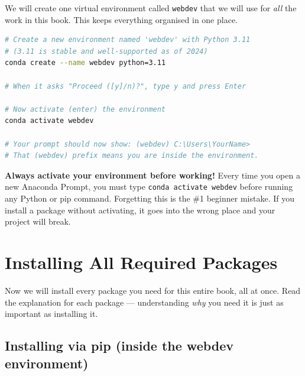 \documentclass[12pt, a4paper]{book}
\begin{document}
We will create one virtual environment called \texttt{webdev} that we will use
for \emph{all} the work in this book. This keeps everything organised in one place.

\begin{lstlisting}[language=bash, style=bashstyle, caption={Create the webdev Environment}]
# Create a new environment named 'webdev' with Python 3.11
# (3.11 is stable and well-supported as of 2024)
conda create --name webdev python=3.11

# When it asks "Proceed ([y]/n)?", type y and press Enter

# Now activate (enter) the environment
conda activate webdev

# Your prompt should now show: (webdev) C:\Users\YourName>
# That (webdev) prefix means you are inside the environment.
\end{lstlisting}

\begin{tcolorbox}[warnbox]
\textbf{Always activate your environment before working!}
Every time you open a new Anaconda Prompt, you must type
\texttt{conda activate webdev} before running any Python or pip command.
Forgetting this is the \#1 beginner mistake. If you install a package
without activating, it goes into the wrong place and your project will break.
\end{tcolorbox}

\section{Installing All Required Packages}

Now we will install every package you need for this entire book, all at once.
Read the explanation for each package --- understanding \emph{why} you need it
is just as important as installing it.

\subsection{Installing via pip (inside the webdev environment)}
\end{document}
